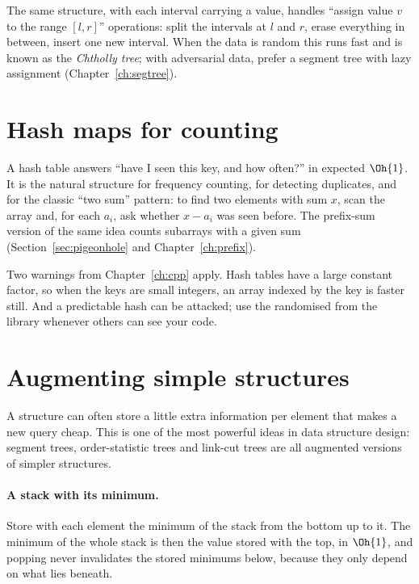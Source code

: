 The same structure, with each interval carrying a value, handles ``assign value $v$ to the range $[l, r]$'' operations: split
the intervals at $l$ and $r$, erase everything in between, insert one new interval. When the data is random this runs fast
and is known as the \emph{Chtholly tree}; with adversarial data, prefer a segment tree with lazy assignment
(Chapter~\ref{ch:segtree}).

\section[Hash maps for counting]{Hash maps for counting \hfill \silver}\label{sec:hashmaps}

A hash table answers ``have I seen this key, and how often?'' in expected $\Oh{1}$. It is the natural structure for
frequency counting, for detecting duplicates, and for the classic ``two sum'' pattern: to find two elements with sum $x$, scan
the array and, for each $a_i$, ask whether $x - a_i$ was seen before. The prefix-sum version of the same idea counts
subarrays with a given sum (Section~\ref{sec:pigeonhole} and Chapter~\ref{ch:prefix}).

Two warnings from Chapter~\ref{ch:cpp} apply. Hash tables have a large constant factor, so when the keys are small integers,
an array indexed by the key is faster still. And a predictable hash can be attacked; use the randomised 
from the library whenever others can see your code.

\section[Augmenting simple structures]{Augmenting simple structures \hfill \gold}\label{sec:augment}

A structure can often store a little extra information per element that makes a new query cheap. This 
is one of the most powerful ideas in data structure design: segment trees, order-statistic trees and link-cut trees are all
augmented versions of simpler structures.

\paragraph{A stack with its minimum.} Store with each element the minimum of the stack from the bottom up to it. The minimum
of the whole stack is then the value stored with the top, in $\Oh{1}$, and popping never invalidates the stored minimums
below, because they only depend on what lies beneath.

